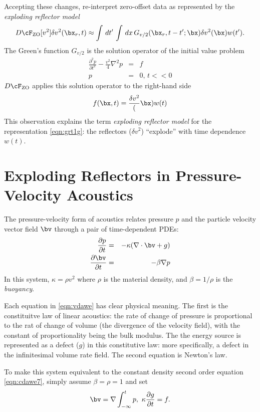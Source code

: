 Accepting these changes, re-interpret zero-offset data as represented by the {\em exploding reflector model}
\begin{equation}
\label{eqn:grt2g}
D\cF_{\rm ZO}[v^2]\delta v^2(\bx_r,t) \approx  \int\, dt'\,\int \, dx \, G_{v/2}(\bx_r,t-t';\bx) \delta v^2(\bx)w(t').
\end{equation}
The Green's function $G_{v/2}$ is the solution operator of the initial value problem
\begin{eqnarray}
\label{eqn:cdawe7}
\frac{\partial^2 p}{\partial t^2} - \frac{v^2}{4} \nabla^2 p & = & f \nonumber\\
p & = & 0, \,t<<0
\end{eqnarray}
$D\cF_{\rm ZO}$ applies this solution operator to the right-hand side 
\begin{equation}
\label{eqn:explref}
f(\bx,t) = \frac{\delta v^2}(\bx) w(t) 
\end{equation}
This observation explains the term {\em exploding reflector model} for the representation \ref{eqn:grt1g}: the reflectors ($\delta v^2$) ``explode'' with time dependence $w(t)$. 

\section{Exploding Reflectors in Pressure-Velocity Acoustics}
The pressure-velocity form of acoustics relates pressure $p$ and the particle velocity vector field $\bv$ through a pair of time-dependent PDEs: 
\begin{eqnarray}
\label{eqn:vdawe}
\frac{\partial p}{\partial t}&=& -\kappa (\nabla \cdot \bv + g) \nonumber \\
\frac{\partial \bv}{\partial t} &=& -\beta \nabla p
\end{eqnarray}
In this system, $\kappa = \rho v^2$ where $\rho$ is the material density, and $\beta = 1/\rho$ is the {\em buoyancy}.  

Each equation in \ref{eqn:vdawe} has clear physical meaning. The first is the constituitve law of linear acoustics: the rate of change of pressure is proportional to the rat of change of volume (the divergence of the velocity field), with the constant of proportionality being the bulk modulus. The the energy source is represented as a defect ($g$) in this constitutive law: more specifically, a defect in the infinitesimal volume rate field. The second equation is Newton's law.

To make this system equivalent to the constant density second order equation \ref{eqn:cdawe7}, simply assume $\beta=\rho=1$ and set 
\[
\bv = \nabla \int_{-\infty}^t p,\,\,\kappa \frac{\partial g}{\partial t} = f.
\]


